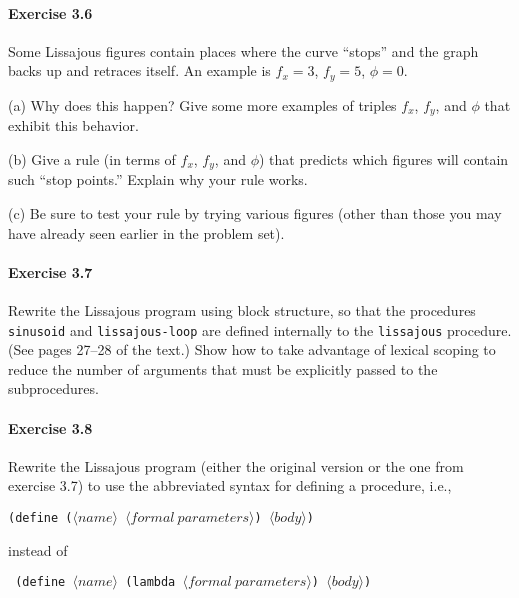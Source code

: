 \paragraph{Exercise 3.6}
Some Lissajous figures contain places where the curve ``stops'' and
the graph backs up and retraces itself.  An example is $f_x=3$,
$f_y=5$, $\phi=0$.  

(a) Why does this happen?  Give some more examples of
triples $f_x$, $f_y$, and $\phi$ that exhibit this behavior.  

(b) Give a
rule (in terms of $f_x$, $f_y$, and $\phi$) that predicts which
figures will contain such ``stop points.''  Explain why your rule works.

(c) Be sure to test your rule by trying various figures (other than those you
may have already seen earlier in the problem set).

\paragraph{Exercise 3.7}
Rewrite the Lissajous program using block structure, so that the
procedures {\tt sinusoid} and {\tt lissajous-loop} are defined
internally to the {\tt lissajous} procedure.  (See pages 27--28 of the
text.)  Show how to take advantage of lexical scoping to reduce the
number of arguments that must be explicitly passed to the
subprocedures.

\paragraph{Exercise 3.8}
Rewrite the Lissajous program (either the original version or the one
from exercise 3.7) to use the abbreviated syntax for defining a
procedure, i.e.,

\noindent
{\tt (define ($\langle name\rangle$ $\langle formal\ parameters\rangle$) $\langle body\rangle$)}

\noindent
instead of

{\tt
(define $\langle name\rangle$ (lambda $\langle formal\ parameters\rangle$) $\langle body\rangle$)}













